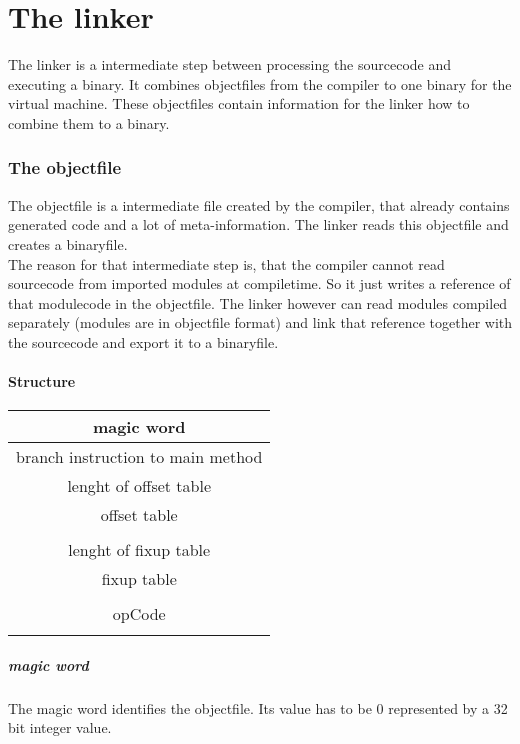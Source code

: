 \part{The linker}
The linker is a intermediate step between processing the sourcecode and executing a
binary. It combines objectfiles from the compiler to one binary for the virtual
machine. These objectfiles contain information for the linker how to combine
them to a binary. 

\section{The objectfile}
\label{objectfile}
The objectfile is a intermediate file created by the compiler, that already
contains generated code and a lot of meta-information. The linker reads this
objectfile and creates a binaryfile. \\
The reason for that intermediate step is, that the compiler cannot read sourcecode
from imported modules at compiletime. So it just writes a reference of that modulecode
in the objectfile. The linker however can read modules compiled separately
(modules are in objectfile format) and link that reference together with the
sourcecode and export it to a binaryfile.
\subsection{Structure}
\label{objectfile_structure}

\begin{tabular}{|c|}
\hline
magic word \\
\hline 
branch instruction to main method \\
\hline
lenght of offset table \\
\hline
offset table \\ \\
\hline
lenght of fixup table \\
\hline
fixup table \\ \\
\hline
opCode \\ \\
\hline 
\end{tabular}

\subsubsection{magic word} 
\label{magic_word}
The magic word identifies the objectfile. Its value has to be $0$ represented
by a 32 bit integer value. 
